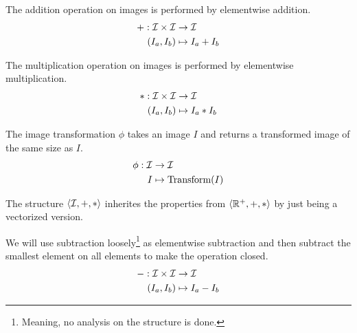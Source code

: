 \begin{definition}
    The addition operation on images is performed by elementwise addition.
        \begin{equation}
            \begin{split}
                + : \mathcal{I} \times \mathcal{I} &\rightarrow \mathcal{I}\\
                     (I_a,I_b) &\mapsto I_a+I_b
            \end{split}
        \end{equation}
\end{definition}

\begin{definition}
    The multiplication operation on images is performed by elementwise multiplication.
        \begin{equation}
            \begin{split}
                * : \mathcal{I} \times \mathcal{I} &\rightarrow \mathcal{I}\\
                     (I_a,I_b) &\mapsto I_a*I_b
            \end{split}
        \end{equation}
\end{definition}

\begin{definition}
    The image transformation $\phi$ takes an image $I$ and returns a transformed image of the same size as $I$.
    \begin{equation}
        \begin{split}
            \phi : \mathcal{I} &\rightarrow \mathcal{I}\\
                I &\mapsto \text{Transform}(I)
        \end{split}
    \end{equation}
\end{definition}

The structure $\langle \mathcal{I},+,*\rangle$ inherites the properties from $\langle \mathbb{R}^+,+,*\rangle$ by just being a vectorized version.

\begin{definition}
   We will use subtraction loosely\footnote{Meaning, no analysis on the structure is done.} as elementwise subtraction and then subtract the smallest element on all elements to make the operation closed.
        \begin{equation}
            \begin{split}
                - : \mathcal{I} \times \mathcal{I} &\rightarrow \mathcal{I}\\
                     (I_a,I_b) &\mapsto I_a-I_b
            \end{split}
        \end{equation}
\end{definition}

